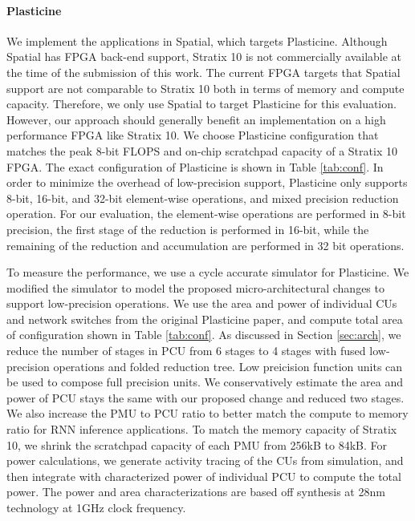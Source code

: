 \paragraph{Plasticine} We implement the applications in Spatial, which targets Plasticine.
Although Spatial has FPGA back-end support, Stratix 10 is not commercially available at the time of the submission of this work.
The current FPGA targets that Spatial support are not comparable to Stratix 10 both in terms of memory and compute capacity. 
Therefore, we only use Spatial to target Plasticine for this evaluation. However, our approach should generally benefit
an implementation on a high performance FPGA like Stratix 10.
We choose Plasticine configuration that matches the peak 8-bit FLOPS and
on-chip scratchpad capacity of a Stratix 10 FPGA. The exact configuration of Plasticine is shown in Table \ref{tab:conf}.
In order to minimize the overhead of low-precision support, Plasticine only supports 8-bit, 16-bit, and 32-bit element-wise 
operations, and mixed precision reduction operation. 
For our evaluation, the element-wise operations are performed in 8-bit precision, 
the first stage of the reduction is performed in 16-bit, 
while the remaining of the reduction and accumulation are performed in 32 bit operations.

To measure the performance, we use a cycle accurate simulator for Plasticine. 
We modified the simulator to model the proposed micro-architectural changes to support low-precision operations.
We use the area and power of individual CUs and network switches from the original Plasticine paper, 
and compute total area of configuration shown in Table \ref{tab:conf}. 
As discussed in Section \ref{sec:arch}, we reduce the number of stages in PCU from 6 stages to 4 stages with fused low-precision
operations and folded reduction tree. 
Low preicision function units can be used to compose full precision units. 
We conservatively estimate the area and power of PCU stays the same with our proposed change and reduced two stages. 
We also increase the PMU to PCU ratio to better match the compute to memory
ratio for RNN inference applications. To match the memory capacity of Stratix 10, we shrink the scratchpad capacity of 
each PMU from 256kB to 84kB.
For power calculations, we generate activity tracing of the CUs from simulation, and then integrate 
with characterized power of individual PCU to compute the total power. The power and area characterizations are based off
synthesis at 28nm technology at 1GHz clock frequency.

